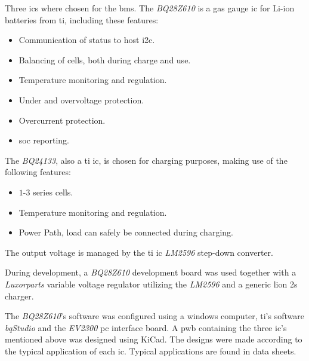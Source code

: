Three \gls{ic}s where chosen for the \gls{bms}. The \emph{BQ28Z610} is a gas gauge \gls{ic} for Li-ion batteries from \gls{ti}, including these features:

\begin{itemize}[noitemsep]
	\item Communication of status to host \gls{i2c}.
	\item Balancing of cells, both during charge and use.
	\item Temperature monitoring and regulation.
	\item Under and overvoltage protection.
	\item Overcurrent protection.
	\item \gls{soc} reporting.
\end{itemize}

The \emph{BQ24133}, also a \gls{ti} \gls{ic}, is chosen for charging purposes, making use of the following features:

\begin{itemize}[noitemsep]
	\item $1$-$3$ series cells.
	\item Temperature monitoring and regulation.
	\item Power Path, load can safely be connected during charging.
\end{itemize}

\noindent The output voltage is managed by the \gls{ti} \gls{ic} \emph{LM2596} step-down converter.

During development, a \emph{BQ28Z610} development board was used together with a \emph{Luxorparts} variable voltage regulator utilizing the \emph{LM2596} and a generic \gls{lion} \gls{2s} charger.

The \emph{BQ28Z610}'s software was configured using a windows computer, \gls{ti}'s software \emph{bqStudio}\cite{bqStudio} and the \emph{EV2300} \gls{pc} interface board.
A \gls{pwb} containing the three \gls{ic}'s mentioned above was designed using KiCad\cite{kicad}. The designs were made according to the typical application of each \gls{ic}. Typical applications are found in data sheets.  

